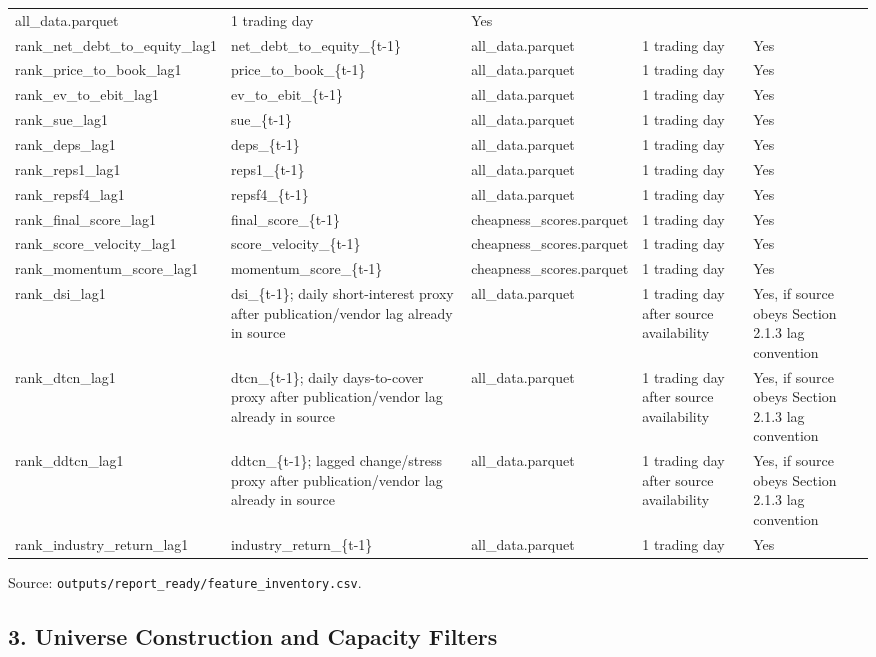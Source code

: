\documentclass[
]{article}
\begin{document}
\begin{longtable}[]{@{}lllll@{}}
all\_data.parquet & 1 trading day & Yes \\
rank\_net\_debt\_to\_equity\_lag1 & net\_debt\_to\_equity\_\{t-1\} &
all\_data.parquet & 1 trading day & Yes \\
rank\_price\_to\_book\_lag1 & price\_to\_book\_\{t-1\} &
all\_data.parquet & 1 trading day & Yes \\
rank\_ev\_to\_ebit\_lag1 & ev\_to\_ebit\_\{t-1\} & all\_data.parquet & 1
trading day & Yes \\
rank\_sue\_lag1 & sue\_\{t-1\} & all\_data.parquet & 1 trading day &
Yes \\
rank\_deps\_lag1 & deps\_\{t-1\} & all\_data.parquet & 1 trading day &
Yes \\
rank\_reps1\_lag1 & reps1\_\{t-1\} & all\_data.parquet & 1 trading day &
Yes \\
rank\_repsf4\_lag1 & repsf4\_\{t-1\} & all\_data.parquet & 1 trading day
& Yes \\
rank\_final\_score\_lag1 & final\_score\_\{t-1\} &
cheapness\_scores.parquet & 1 trading day & Yes \\
rank\_score\_velocity\_lag1 & score\_velocity\_\{t-1\} &
cheapness\_scores.parquet & 1 trading day & Yes \\
rank\_momentum\_score\_lag1 & momentum\_score\_\{t-1\} &
cheapness\_scores.parquet & 1 trading day & Yes \\
rank\_dsi\_lag1 & dsi\_\{t-1\}; daily short-interest proxy after
publication/vendor lag already in source & all\_data.parquet & 1 trading
day after source availability & Yes, if source obeys Section 2.1.3 lag
convention \\
rank\_dtcn\_lag1 & dtcn\_\{t-1\}; daily days-to-cover proxy after
publication/vendor lag already in source & all\_data.parquet & 1 trading
day after source availability & Yes, if source obeys Section 2.1.3 lag
convention \\
rank\_ddtcn\_lag1 & ddtcn\_\{t-1\}; lagged change/stress proxy after
publication/vendor lag already in source & all\_data.parquet & 1 trading
day after source availability & Yes, if source obeys Section 2.1.3 lag
convention \\
rank\_industry\_return\_lag1 & industry\_return\_\{t-1\} &
all\_data.parquet & 1 trading day & Yes \\
\bottomrule
\end{longtable}

Source: \texttt{outputs/report\_ready/feature\_inventory.csv}.

\hypertarget{3-universe-construction-and-capacity-filters}{%
\subsection{3. Universe Construction and Capacity
Filters}\label{3-universe-construction-and-capacity-filters}}
\end{document}
